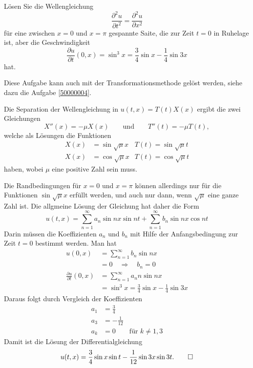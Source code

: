 Lösen Sie die Wellengleichung
\[
\frac{\partial^2 u}{\partial t^2}=\frac{\partial^2 u}{\partial x^2}
\]
für eine zwischen $x=0$ und $x=\pi$ gespannte Saite,
die zur Zeit $t=0$ in Ruhelage ist, aber die Geschwindigkeit
\[
\frac{\partial u}{\partial t}(0, x)
=
\sin^3 x=\frac34\sin x-\frac14\sin 3x
\]
hat.

\begin{hinweis}
Diese Aufgabe kann auch mit der Transformationsmethode gelöst werden,
siehe dazu die Aufgabe \ref{50000004}.
\end{hinweis}

\begin{loesung}
Die Separation der Wellengleichung in $u(t,x)=T(t)X(x)$ ergibt die
zwei Gleichungen
\[
X''(x)=-\mu X(x)\qquad\text{und}\qquad T''(t)=-\mu T(t),
\]
welche als Lösungen die Funktionen
\begin{align*}
X(x)&=\sin\sqrt{\mu}x & T(t)=\sin\sqrt{\mu}t\\
X(x)&=\cos\sqrt{\mu}x & T(t)=\cos\sqrt{\mu}t
\end{align*}
haben, wobei $\mu$ eine positive Zahl sein muss.

Die Randbedingungen für $x=0$ und $x=\pi$ können allerdings nur
für die Funktionen $\sin\sqrt{\mu}x$ erfüllt werden, und auch nur dann,
wenn $\sqrt{\mu}$ eine ganze Zahl ist. Die allgmeine Lösung der Gleichung
hat daher die Form
\[
u(t,x)
=
\sum_{n=1}^\infty a_n\sin nx \sin nt+\sum_{n=1}^\infty b_n\sin nx\cos nt
\]
Darin müssen die Koeffizienten $a_n$ und $b_n$ mit Hilfe der 
Anfangsbedingung zur Zeit $t=0$ bestimmt werden. Man hat
\begin{align*}
u(0,x)&=
\sum_{n=1}^\infty b_n\sin nx
\\
&=0\quad\Rightarrow\quad b_n=0
\\
\frac{\partial u}{\partial t}(0,x)
&=
\sum_{n=1}^\infty a_nn\sin nx
\\
&=
\sin^3 x=\frac34\sin x-\frac14\sin 3x
\end{align*}
Daraus folgt durch Vergleich der Koeffizienten
\begin{align*}
a_1&=\frac34\\
a_3&=-\frac{1}{12}\\
a_k&=0\qquad\text{für $k\ne 1,3$}
\end{align*}
Damit ist die Lösung der Differentialgleichung
\[
u(t,x)
= \frac34\sin x \sin t -\frac1{12}\sin 3x \sin 3t.
\qedhere
\]
\end{loesung}
